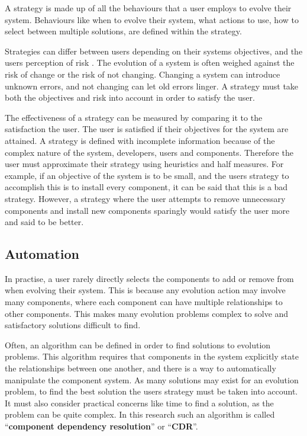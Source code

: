 A strategy is made up of all the behaviours that a user employs to evolve their system.
Behaviours like when to evolve their system, what actions to use, how to select between multiple solutions, are defined within the strategy.

Strategies can differ between users depending on their systems objectives, and the users perception of risk \citep{iso2009}.
The evolution of a system is often weighed against the risk of change or the risk of not changing.
Changing a system can introduce unknown errors, and not changing can let old errors linger. 
A strategy must take both the objectives and risk into account in order to satisfy the user.

The effectiveness of a strategy can be measured by comparing it to the satisfaction the user.
The user is satisfied if their objectives for the system are attained.
A strategy is defined with incomplete information because of the complex nature of the system, developers, users and components.
Therefore the user must approximate their strategy using heuristics and half measures.
For example, if an objective of the system is to be small, and the users strategy to accomplish this is to install every component, it can be said that this is a bad strategy. 
However, a strategy where the user attempts to remove unnecessary components and install new components sparingly would satisfy the user more and said to be better.

\subsection{Automation}
In practise, a user rarely directly selects the components to add or remove from when evolving their system.
This is because any evolution action may involve many components, where each component can have multiple relationships to other components.
This makes many evolution problems complex to solve and satisfactory solutions difficult to find.

Often, an algorithm can be defined in order to find solutions to evolution problems.
This algorithm requires that components in the system explicitly state the relationships between one another, and there is a way to automatically manipulate the component system.
As many solutions may exist for an evolution problem, to find the best solution the users strategy must be taken into account.
It must also consider practical concerns like time to find a solution, as the problem can be quite complex.
In this research such an algorithm is called ``\textbf{component dependency resolution}'' or ``\textbf{CDR}''.

